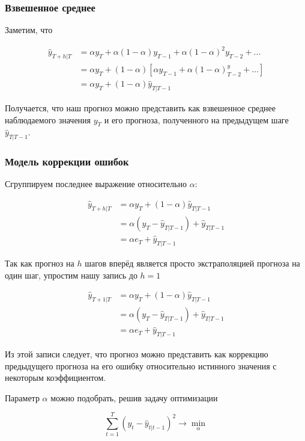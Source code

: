 \documentclass[12pt,fleqn]{article}
\begin{document}
\subsubsection{Взвешенное среднее}

Заметим, что

\begin{equation}
\begin{split}
	\hat{y}_{T+h|T} 
	&= \alpha y_T + \alpha (1-\alpha) y_{T-1} + \alpha (1-\alpha)^2 y_{T-2} + \ldots \\
	&= \alpha y_T +(1-\alpha)[ \alpha y_{T-1} + \alpha (1-\alpha)^ y_{T-2} + \ldots ] \\
	&=  \alpha y_T +(1-\alpha) \hat{y}_{T|T-1}
\end{split}
\end{equation}

Получается, что наш прогноз можно представить как взвешенное среднее наблюдаемого значения $y_T$ и его прогноза, полученного на предыдущем шаге $\hat{y}_{T|T-1}$.

\subsubsection{Модель коррекции ошибок}

Сгруппируем последнее выражение относительно $\alpha$:

\begin{equation}
	\begin{split}
		\hat{y}_{T+h|T} 
		&=  \alpha y_T +(1-\alpha) \hat{y}_{T|T-1} \\
		&= \alpha (y_T - \hat{y}_{T|T-1}) + \hat{y}_{T|T-1} \\
		&= \alpha e_T + \hat{y}_{T|T-1}
	\end{split}
\end{equation}

Так как прогноз на $h$ шагов вперёд является просто экстраполяцией прогноза на один шаг, упростим нашу запись до $h=1$


\begin{equation}
	\begin{split}
		\hat{y}_{T+1|T} 
		&=  \alpha y_T +(1-\alpha) \hat{y}_{T|T-1} \\
		&= \alpha (y_T - \hat{y}_{T|T-1}) + \hat{y}_{T|T-1} \\
		&= \alpha e_T + \hat{y}_{T|T-1}
	\end{split}
\end{equation}

Из этой записи следует, что прогноз можно представить как коррекцию предыдущего прогноза на его ошибку относительно истинного значения с некоторым коэффициентом.

Параметр $\alpha$ можно подобрать, решив задачу оптимизации

$$
\sum_{t=1}^{T}(y_t - \hat{y}_{t|t-1})^2 \rightarrow \min_\alpha
$$

	\begin{thebibliography}{1}
	
	\end{thebibliography}
	
\end{document}
